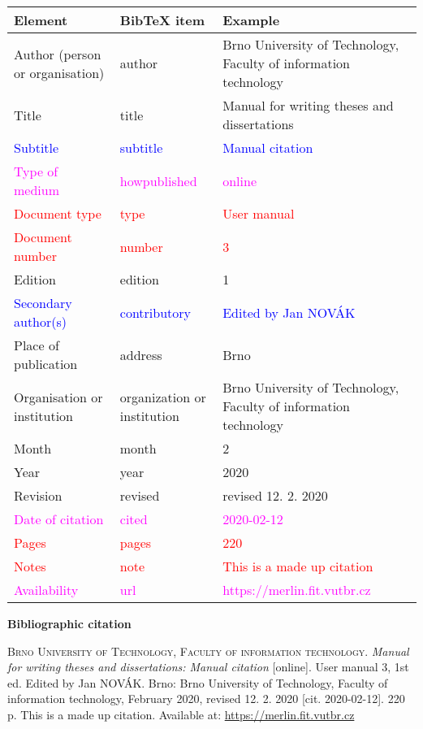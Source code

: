 \begin{tabularx}{\linewidth}{X X X}
    Element & BibTeX item & Example\\\hline
    Author (person or organisation) & author & Brno University of Technology, Faculty of information technology\\
    Title & title & Manual for writing theses and dissertations\\
    \textcolor{blue}{Subtitle} & \textcolor{blue}{subtitle} & \textcolor{blue}{Manual citation}\\
    \textcolor{magenta}{Type of medium} & \textcolor{magenta}{howpublished} & \textcolor{magenta}{online}\\
    \textcolor{red}{Document type} & \textcolor{red}{type} & \textcolor{red}{User manual}\\
    \textcolor{red}{Document number} & \textcolor{red}{number} & \textcolor{red}{3}\\
    Edition & edition & 1\\
    \textcolor{blue}{Secondary author(s)} & \textcolor{blue}{contributory} & \textcolor{blue}{Edited by Jan NOVÁK}\\
    Place of publication & address & Brno\\
    Organisation or institution & organization or institution & Brno University of Technology, Faculty of information technology\\
    Month & month & 2\\
    Year & year & 2020\\
    Revision & revised & revised 12. 2. 2020\\
    \textcolor{magenta}{Date of citation} & \textcolor{magenta}{cited} & \textcolor{magenta}{2020-02-12}\\
    \textcolor{red}{Pages} & \textcolor{red}{pages} & \textcolor{red}{220}\\   
    \textcolor{red}{Notes} & \textcolor{red}{note} & \textcolor{red}{This is a made up citation}\\
    \textcolor{magenta}{Availability} & \textcolor{magenta}{url} & \textcolor{magenta}{https://merlin.fit.vutbr.cz}\\
\end{tabularx}

\bigskip

\noindent \textbf{Bibliographic citation}

\medskip

\noindent \textsc{Brno University of Technology, Faculty of information technology}. \textit{Manual for writing theses and dissertations: Manual citation} [online]. User manual 3, 1st ed. Edited by Jan NOVÁK.
Brno: Brno University of Technology, Faculty of information technology, February 2020, revised 12. 2. 2020 [cit. 2020-02-12]. 220 p. This is a made up citation. Available at: \url{https://merlin.fit.vutbr.cz}
\newpage
